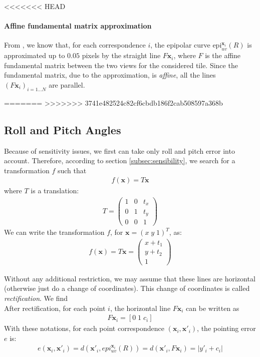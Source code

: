 \documentclass[paper=a4, fontsize=11pt, onecolumn, tikz, dvipsnames, svgnames, x11names]{article}
\begin{document}
<<<<<<< HEAD
\paragraph{Affine fundamental matrix approximation\\}
From  \cite{carlo_2014_pushbroom}, we know that, for each correspondence $i$, the epipolar curve $\text{epi}^{\textbf{x}_i}_{u v}(R)$ is approximated up to $0.05$ pixels by the straight line $F\textbf{x}_i$, where $F$ is
the affine fundamental matrix between the two views for the considered tile. Since the fundamental matrix, due to the approximation, is \textit{affine}, all the lines $(F\textbf{x}_i)_{i=1...N}$ are parallel.

=======
>>>>>>> 3741e482524c82cf6cbdb186f2cab508597a368b
\subsection{Roll and Pitch Angles}
Because of sensitivity issues, we first can take only roll and pitch error into account. Therefore, according to section \ref{subsec:sensibility}, we search for a transformation $f$ such that
\begin{align*}
f(\textbf{x}) = T\textbf{x}
\end{align*}
where $T$ is a translation:
\begin{align*}
T =
\begin{pmatrix}
1 & 0 & t_x \\
0 & 1 & t_y \\
0 & 0 & 1
\end{pmatrix}
\end{align*}
We can write the transformation $f$, for $ \textbf{x} = (  x \; y \; 1)^T $, as:
\begin{align*}
f(\textbf{x}) = T\textbf{x} =
\begin{pmatrix}
x + t_1 \\
y + t_2 \\
1
\end{pmatrix}
\end{align*}


Without any additional restriction, we may assume that these lines are horizontal (otherwise just do a change of coordinates). This change of coordinates is called \textit{rectification}. We find \\%

After rectification, for each point $i$, the horizontal line $F\textbf{x}_i$ can be written as
\begin{align*}
F\textbf{x}_i = \left[ 0 \; 1 \; c_i \right]
\end{align*}
With these notations, for each point correspondence $(\textbf{x}_i , \textbf{x}'_i)$, the pointing error $e$ is:
\begin{align*}
e(\textbf{x}_i, \textbf{x}'_i) = d(\textbf{x}'_i, epi^{\textbf{x}_i}_{u v}(R)) = d(\textbf{x}'_i, F\textbf{x}_i) = | y'_i + c_i|
\end{align*}
\end{document}
